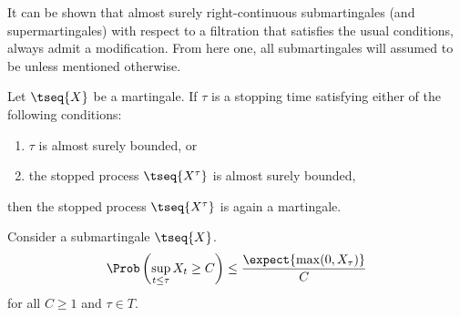     \begin{remark}
        It can be shown that almost surely right-continuous submartingales (and supermartingales) with respect to a filtration that satisfies the usual conditions, always admit a \cdlg modification. From here one, all submartingales will assumed to be \cdlg unless mentioned otherwise.
    \end{remark}

    \begin{theorem}
        Let $\tseq{X}$ be a martingale. If $\tau$ is a stopping time satisfying either of the following conditions:
        \begin{enumerate}
            \item $\tau$ is almost surely bounded, or
            \item the stopped process $\tseq{X^\tau}$ is almost surely bounded,
        \end{enumerate}
        then the stopped process $\tseq{X^\tau}$ is again a martingale.
    \end{theorem}

    \begin{property}\label{prob:doob_inequality}
        Consider a \cdlg submartingale $\tseq{X}$.
        \begin{gather}
            \Prob\left(\sup_{t\leq\tau}X_t\geq C\right)\leq\frac{\expect{\max(0,X_\tau)}}{C}
        \end{gather}
        for all $C\geq1$ and $\tau\in T$.
    \end{property}

